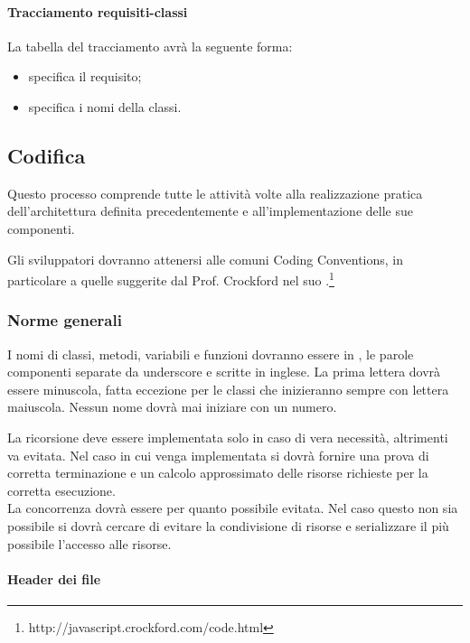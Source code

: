 \paragraph{Tracciamento requisiti-classi}
La tabella del tracciamento avrà la seguente forma:
\begin{itemize}
\item {}specifica il requisito;
\item {}specifica i nomi della classi.
\end{itemize}


\subsection{Codifica}
Questo processo comprende tutte le attività volte alla realizzazione pratica dell'architettura definita precedentemente e all'implementazione delle sue componenti.

Gli sviluppatori dovranno attenersi alle comuni Coding Conventions, in particolare a quelle suggerite dal Prof. Crockford nel suo .\footnote{http://javascript.crockford.com/code.html}\\

\subsubsection{Norme generali}
\label{}
I nomi di classi, metodi, variabili e funzioni dovranno essere in , le parole componenti separate da underscore e scritte in inglese.
La prima lettera dovrà essere minuscola, fatta eccezione per le classi che inizieranno sempre con lettera maiuscola.
Nessun nome dovrà mai iniziare con un numero.

La ricorsione deve essere implementata solo in caso di vera necessità, altrimenti va evitata. Nel caso in cui venga implementata si dovrà fornire una prova di corretta terminazione e un calcolo approssimato delle risorse richieste per la corretta esecuzione.\\
La concorrenza dovrà essere per quanto possibile evitata. Nel caso questo non sia possibile si dovrà cercare di evitare la condivisione di risorse e serializzare il più possibile l'accesso alle risorse.

\paragraph{Header dei file}

